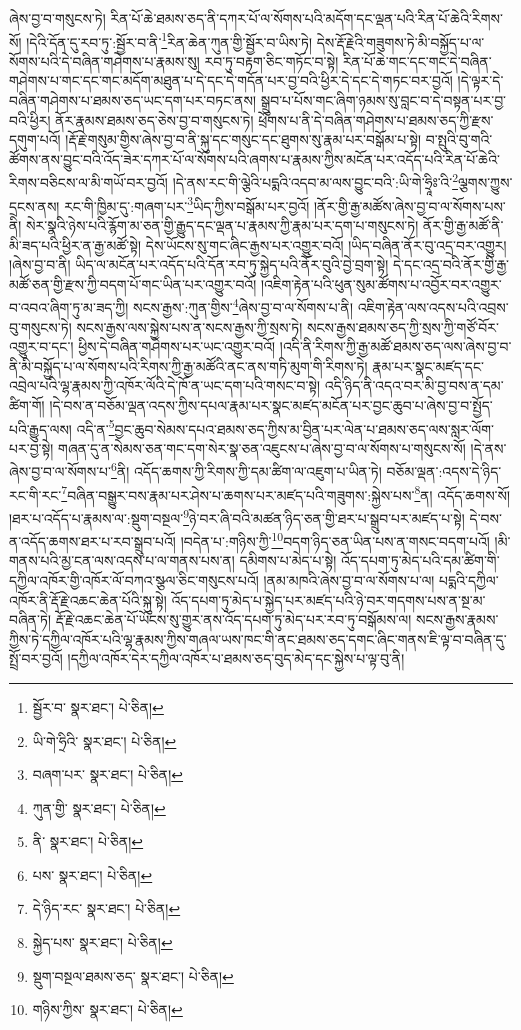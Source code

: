 ཞེས་བྱ་བ་གསུངས་ཏེ། རིན་པོ་ཆེ་ཐམས་ཅད་ནི་དཀར་པོ་ལ་སོགས་པའི་མདོག་དང་ལྡན་པའི་རིན་པོ་ཆེའི་རིགས་སོ། །དེའི་དོན་དུ་རབ་ཏུ་:སྦྱོར་བ་ནི་\footnote{སྦྱོར་བ་  སྣར་ཐང་།  པེ་ཅིན། }རིན་ཆེན་ཀུན་གྱི་སྦྱོར་བ་ཡིས་ཏེ། དེས་རྡོ་རྗེའི་གཟུགས་ཏེ་མི་བསྐྱོད་པ་ལ་སོགས་པའི་དེ་བཞིན་གཤེགས་པ་རྣམས་སུ། རབ་ཏུ་བརྟག་ཅིང་གཏོང་བ་སྟེ། རིན་པོ་ཆེ་གང་དང་གང་དེ་བཞིན་གཤེགས་པ་གང་དང་གང་མདོག་མཐུན་པ་དེ་དང་དེ་གདོན་པར་བྱ་བའི་ཕྱིར་དེ་དང་དེ་གཏང་བར་བྱའོ། །དེ་ལྟར་དེ་བཞིན་གཤེགས་པ་ཐམས་ཅད་ཡང་དག་པར་བཏང་ནས། སྒྲུབ་པ་པོས་གང་ཞིག་ཉམས་སུ་བླང་བ་དེ་བསྟན་པར་བྱ་བའི་ཕྱིར། ནོར་རྣམས་ཐམས་ཅད་ཅེས་བྱ་བ་གསུངས་ཏེ། ཕྲོགས་པ་ནི་དེ་བཞིན་གཤེགས་པ་ཐམས་ཅད་ཀྱི་རྫས་དགུག་པའོ། །རྡོ་རྗེ་གསུམ་གྱིས་ཞེས་བྱ་བ་ནི་སྐུ་དང་གསུང་དང་ཐུགས་སུ་རྣམ་པར་བསྒོམ་པ་སྟེ། བ་སྤུའི་བུ་གའི་ཚོགས་ནས་བྱུང་བའི་འོད་ཟེར་དཀར་པོ་ལ་སོགས་པའི་ཞགས་པ་རྣམས་ཀྱིས་མངོན་པར་འདོད་པའི་རིན་པོ་ཆེའི་རིགས་བཅིངས་ལ་མི་གཡོ་བར་བྱའོ། །དེ་ནས་རང་གི་ལྕེའི་པདྨའི་འདབ་མ་ལས་བྱུང་བའི་:ཡི་གེ་ཧྲཱིཿ་འི་\footnote{ཡི་གེ་ཧྲིའི་  སྣར་ཐང་།  པེ་ཅིན། }ལྕགས་ཀྱུས་དྲངས་ནས། རང་གི་ཁྱིམ་དུ་:གཞག་པར་\footnote{བཞག་པར་  སྣར་ཐང་།  པེ་ཅིན། }ཡིད་ཀྱིས་བསྒོམ་པར་བྱའོ། །ནོར་གྱི་རྒྱ་མཚོས་ཞེས་བྱ་བ་ལ་སོགས་པས་ནི། སེར་སྣའི་ཉེས་པའི་རྙོག་མ་ཅན་གྱི་རྒྱུད་དང་ལྡན་པ་རྣམས་ཀྱི་རྣམ་པར་དག་པ་གསུངས་ཏེ། ནོར་གྱི་རྒྱ་མཚོ་ནི་མི་ཟད་པའི་ཕྱིར་ན་རྒྱ་མཚོ་སྟེ། དེས་ཡོངས་སུ་གང་ཞིང་རྒྱས་པར་འགྱུར་བའོ། །ཡིད་བཞིན་ནོར་བུ་འདྲ་བར་འགྱུར། །ཞེས་བྱ་བ་ནི། ཡིད་ལ་མངོན་པར་འདོད་པའི་དོན་རབ་ཏུ་སྐྱེད་པའི་ནོར་བུའི་བྱེ་བྲག་སྟེ། དེ་དང་འདྲ་བའི་ནོར་གྱི་རྒྱ་མཚོ་ཅན་གྱི་རྫས་ཀྱི་བདག་པོ་གང་ཡིན་པར་འགྱུར་བའོ། །འཇིག་རྟེན་པའི་ཕུན་སུམ་ཚོགས་པ་འབྱོར་བར་འགྱུར་བ་འབའ་ཞིག་ཏུ་མ་ཟད་ཀྱི། སངས་རྒྱས་:ཀུན་གྱིས་\footnote{ཀུན་གྱི་  སྣར་ཐང་།  པེ་ཅིན། }ཞེས་བྱ་བ་ལ་སོགས་པ་ནི། འཇིག་རྟེན་ལས་འདས་པའི་འབྲས་བུ་གསུངས་ཏེ། སངས་རྒྱས་ལས་སྐྱེས་པས་ན་སངས་རྒྱས་ཀྱི་སྲས་ཏེ། སངས་རྒྱས་ཐམས་ཅད་ཀྱི་སྲས་ཀྱི་གཙོ་བོར་འགྱུར་བ་དང་། ཕྱིས་དེ་བཞིན་གཤེགས་པར་ཡང་འགྱུར་བའོ། །འདི་ནི་རིགས་ཀྱི་རྒྱ་མཚོ་ཐམས་ཅད་ལས་ཞེས་བྱ་བ་ནི་མི་བསྐྱོད་པ་ལ་སོགས་པའི་རིགས་ཀྱི་རྒྱ་མཚོའི་ནང་ནས་གཏི་མུག་གི་རིགས་ཏེ། རྣམ་པར་སྣང་མཛད་དང་འབྲེལ་པའི་ལྷ་རྣམས་ཀྱི་འཁོར་ལོའི་དེ་ཁོ་ན་ཡང་དག་པའི་གསང་བ་སྟེ། འདི་ཉིད་ནི་འདའ་བར་མི་བྱ་བས་ན་དམ་ཚིག་གོ། །དེ་བས་ན་བཅོམ་ལྡན་འདས་ཀྱིས་དཔལ་རྣམ་པར་སྣང་མཛད་མངོན་པར་བྱང་ཆུབ་པ་ཞེས་བྱ་བ་སྤྱོད་པའི་རྒྱུད་ལས། འདི་ན་\footnote{ནི་  སྣར་ཐང་།  པེ་ཅིན། }བྱང་ཆུབ་སེམས་དཔའ་ཐམས་ཅད་ཀྱིས་མ་བྱིན་པར་ལེན་པ་ཐམས་ཅད་ལས་སླར་ལོག་པར་བྱ་སྟེ། གཞན་དུ་ན་སེམས་ཅན་གང་དག་སེར་སྣ་ཅན་འཇུངས་པ་ཞེས་བྱ་བ་ལ་སོགས་པ་གསུངས་སོ། །དེ་ནས་ཞེས་བྱ་བ་ལ་སོགས་པ་\footnote{པས་  སྣར་ཐང་།  པེ་ཅིན། }ནི། འདོད་ཆགས་ཀྱི་རིགས་ཀྱི་དམ་ཚིག་ལ་འཇུག་པ་ཡིན་ཏེ། བཅོམ་ལྡན་:འདས་དེ་ཉིད་རང་གི་རང་\footnote{དེ་ཉིད་རང་  སྣར་ཐང་།  པེ་ཅིན། }བཞིན་བསྒྱུར་བས་རྣམ་པར་ཤེས་པ་ཆགས་པར་མཛད་པའི་གཟུགས་:སྐྱེས་པས་\footnote{སྐྱེད་པས་  སྣར་ཐང་།  པེ་ཅིན། }ན། འདོད་ཆགས་སོ། །ཐར་པ་འདོད་པ་རྣམས་ལ་:སྡུག་བསྔལ་\footnote{སྡུག་བསྔལ་ཐམས་ཅད་  སྣར་ཐང་།  པེ་ཅིན། }ཉེ་བར་ཞི་བའི་མཚན་ཉིད་ཅན་གྱི་ཐར་པ་སྒྲུབ་པར་མཛད་པ་སྟེ། དེ་བས་ན་འདོད་ཆགས་ཐར་པ་རབ་སྒྲུབ་པའོ། །བདེན་པ་:གཉིས་ཀྱི་\footnote{གཉིས་ཀྱིས་  སྣར་ཐང་།  པེ་ཅིན། }བདག་ཉིད་ཅན་ཡིན་པས་ན་གསང་བདག་པའོ། །མི་གནས་པའི་མྱ་ངན་ལས་འདས་པ་ལ་གནས་པས་ན། དམིགས་པ་མེད་པ་སྟེ། འོད་དཔག་ཏུ་མེད་པའི་དམ་ཚིག་གི་དཀྱིལ་འཁོར་གྱི་འཁོར་ལོ་བཀའ་སྩལ་ཅིང་གསུངས་པའོ། །ནམ་མཁའི་ཞེས་བྱ་བ་ལ་སོགས་པ་ལ། པདྨའི་དཀྱིལ་འཁོར་ནི་རྡོ་རྗེ་འཆང་ཆེན་པོའི་སྐུ་སྟེ། འོད་དཔག་ཏུ་མེད་པ་སྐྱེད་པར་མཛད་པའི་ཉེ་བར་གདགས་པས་ན་སྔ་མ་བཞིན་ཏེ། རྡོ་རྗེ་འཆང་ཆེན་པོ་ཡོངས་སུ་གྱུར་ནས་འོད་དཔག་ཏུ་མེད་པར་རབ་ཏུ་བསྒོམས་ལ། སངས་རྒྱས་རྣམས་ཀྱིས་ཏེ་དཀྱིལ་འཁོར་པའི་ལྷ་རྣམས་ཀྱིས་གཞལ་ཡས་ཁང་གི་ནང་ཐམས་ཅད་དགང་ཞིང་གནས་ཇི་ལྟ་བ་བཞིན་དུ་སྤྲོ་བར་བྱའོ། །དཀྱིལ་འཁོར་དེར་དཀྱིལ་འཁོར་པ་ཐམས་ཅད་བུད་མེད་དང་སྐྱེས་པ་ལྟ་བུ་ནི། 